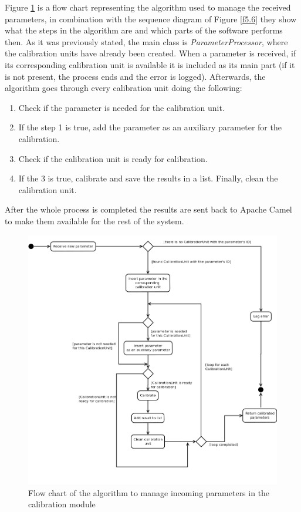 Figure \ref{f5.5} is a flow chart representing the algorithm used to manage the received parameters, in combination with the sequence diagram of Figure \ref{f5.6} they show what the steps in the algorithm are and which parts of the software performs then. As it was previously stated, the main class is \emph{ParameterProcessor}, where the calibration units have already been created. When a parameter is received, if its corresponding calibration unit is available it is included as its main part (if it is not present, the process ends and the error is logged). Afterwards, the algorithm goes through every calibration unit doing the following:
\begin{enumerate}
\item Check if the parameter is needed for the calibration unit.
\item If the step 1 is true, add the parameter as an auxiliary parameter for the calibration.
\item Check if the calibration unit is ready for calibration.
\item If the 3 is true, calibrate and save the results in a list. Finally, clean the calibration unit.
\end{enumerate}

After the whole process is completed the results are sent back to Apache Camel to make them available for the rest of the system.

\begin{figure}[H]
\centerline{\includegraphics[width=1\textwidth]{images/ReceiveParameterAndCalibrateFlowChart.png}}
\caption{Flow chart of the algorithm to manage incoming parameters in the calibration module}
\label{f5.5}
\end{figure}


